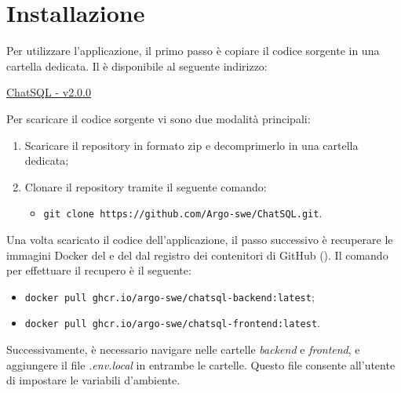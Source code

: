 \section{Installazione}

\par Per utilizzare l'applicazione, il primo passo è copiare il codice sorgente in una cartella dedicata. Il  è disponibile al seguente indirizzo:

\quad \href{https://github.com/Argo-swe/ChatSQL/tree/v2.0.0}{ChatSQL - v2.0.0} \newline

\par Per scaricare il codice sorgente vi sono due modalità principali:
\begin{enumerate}
  \item Scaricare il repository in formato zip e decomprimerlo in una cartella dedicata;
  \item Clonare il repository tramite il seguente comando:
  \begin{itemize} 
    \item \texttt{git clone https://github.com/Argo-swe/ChatSQL.git}.
  \end{itemize}
\end{enumerate}

\vspace{0.5\baselineskip}
\par Una volta scaricato il codice dell'applicazione, il passo successivo è recuperare le immagini Docker del  e del  dal registro dei contenitori di GitHub (). Il comando per effettuare il recupero è il seguente:
\begin{itemize}
  \item \texttt{docker pull ghcr.io/argo-swe/chatsql-backend:latest};
  \item \texttt{docker pull ghcr.io/argo-swe/chatsql-frontend:latest}.
\end{itemize}

\vspace{0.5\baselineskip}
\par Successivamente, è necessario navigare nelle cartelle \textit{backend} e \textit{frontend}, e aggiungere il file \textit{.env.local} in entrambe le cartelle. Questo file consente all'utente di impostare le variabili d'ambiente.